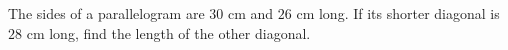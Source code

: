 The sides of a parallelogram are $30$ cm and $26$ cm long. If its shorter diagonal is $28$ cm long, find the length of the other diagonal.
